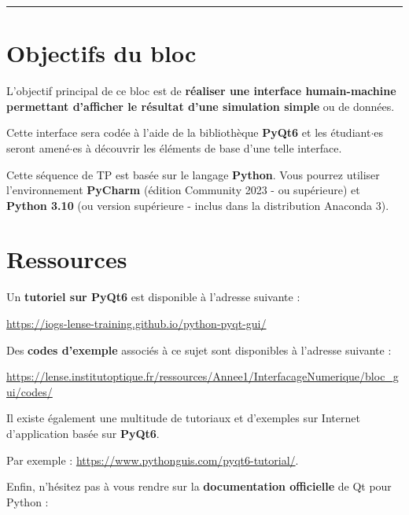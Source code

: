 \documentclass[a4paper,11pt,titlepage]{article} %
\begin{document}
\noindent \rule{\linewidth}{1pt}

\medskip



\section{Objectifs du bloc}

L'objectif principal de ce bloc est de \textbf{réaliser une interface humain-machine permettant d'afficher le résultat d'une simulation simple} ou de données.

Cette interface sera codée à l'aide de la bibliothèque \textbf{PyQt6} et les étudiant$\cdot$es seront amené$\cdot$es à découvrir les éléments de base d'une telle interface.

Cette séquence de TP est basée sur le langage \textbf{Python}. Vous pourrez utiliser l'environnement \textbf{PyCharm} (édition Community 2023 - ou supérieure) et \textbf{Python 3.10} (ou version supérieure - inclus dans la distribution Anaconda 3).


\section{Ressources}

Un \textbf{tutoriel sur PyQt6} est disponible à l'adresse suivante :

\href{https://iogs-lense-training.github.io/python-pyqt-gui/}{https://iogs-lense-training.github.io/python-pyqt-gui/}

Des \textbf{codes d'exemple} associés à ce sujet sont disponibles à l'adresse suivante : 

\href{https://lense.institutoptique.fr/ressources/Annee1/InterfacageNumerique/bloc_gui/codes/}{https://lense.institutoptique.fr/ressources/Annee1/InterfacageNumerique/bloc\_gui/codes/}

\medskip

Il existe également une multitude de tutoriaux et d'exemples sur Internet d'application basée sur \textbf{PyQt6}. 

Par exemple :  \href{https://www.pythonguis.com/pyqt6-tutorial/}{https://www.pythonguis.com/pyqt6-tutorial/}.

\medskip

Enfin, n'hésitez pas à vous rendre sur la \textbf{documentation officielle} de Qt pour Python : 
\end{document}
